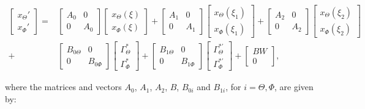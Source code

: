 \documentclass[main.tex]{subfiles}
\begin{document}
	\begin{align}
		\begin{bmatrix}
			x_\Theta' \\
			x_\Phi'
		\end{bmatrix} =&
		\begin{bmatrix}
			A_0 & 0 \\
			0 & A_0
		\end{bmatrix}
		\begin{bmatrix}
			x_\Theta(\xi) \\
			x_\Phi(\xi)
		\end{bmatrix} + 
		\begin{bmatrix}
		A_1 & 0 \\
		0 & A_1
		\end{bmatrix}
		\begin{bmatrix}
		x_\Theta(\xi_1) \\
		x_\Phi(\xi_1)
		\end{bmatrix} +
		\begin{bmatrix}
		A_2 & 0 \\
		0 & A_2
		\end{bmatrix}
		\begin{bmatrix}
		x_\Theta(\xi_2) \\
		x_\Phi(\xi_2)
		\end{bmatrix} \nonumber\\
		+&
	   \begin{bmatrix}
		B_{0\Theta} & 0\\
		0 & B_{0\Phi}
		\end{bmatrix} 
		\begin{bmatrix}
		\Gamma_\Theta^* \\
		\Gamma_\Phi^*
		\end{bmatrix} +
		\begin{bmatrix}
		B_{1\Theta} & 0\\
		0 & B_{1\Phi}
		\end{bmatrix} 
		\begin{bmatrix}
		\Gamma_\Theta^{*'} \\
		\Gamma_\Phi^{*'}
		\end{bmatrix} + 
		\begin{bmatrix}
		BW \\
		0
		\end{bmatrix},
		\label{eq:systemstatespace}	
	\end{align}
	
	where the matrices and vectors $A_0$, $A_1$, $A_2$, $B$, $B_{0i}$ and $B_{1i}$, for $i = \Theta, \Phi$, are given by:
	
\end{document}

